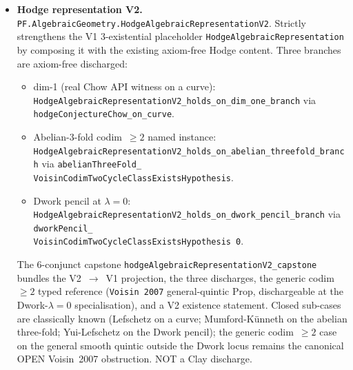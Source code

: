 \begin{itemize}
\item \textbf{Hodge representation V2.}
\texttt{PF.\allowbreak{}Algebraic\allowbreak{}Geometry.\allowbreak{}Hodge\allowbreak{}Algebraic\allowbreak{}Representation\allowbreak{}V2}.
Strictly strengthens the V1 3-existential placeholder
\texttt{HodgeAlgebraicRepresentation} by composing it with the
existing axiom-free Hodge content. Three branches are axiom-free
discharged:
\begin{itemize}
\item dim-1 (real Chow API witness on a curve):
\texttt{Hodge\allowbreak{}Algebraic\allowbreak{}Representation\allowbreak{}V2\_\allowbreak{}holds\_\allowbreak{}on\_\allowbreak{}dim\_\allowbreak{}one\_\allowbreak{}branch}
via \texttt{hodge\allowbreak{}Conjecture\allowbreak{}Chow\_\allowbreak{}on\_\allowbreak{}curve}.
\item Abelian-3-fold codim~$\ge 2$ named instance:
\texttt{Hodge\allowbreak{}Algebraic\allowbreak{}Representation\allowbreak{}V2\_\allowbreak{}holds\_\allowbreak{}on\_\allowbreak{}abelian\_\allowbreak{}threefold\_\allowbreak{}branch}
via
\texttt{abelianThreeFold\_\\VoisinCodimTwoCycleClassExistsHypothesis}.
\item Dwork pencil at $\lambda = 0$:
\texttt{Hodge\allowbreak{}Algebraic\allowbreak{}Representation\allowbreak{}V2\_\allowbreak{}holds\_\allowbreak{}on\_\allowbreak{}dwork\_\allowbreak{}pencil\_\allowbreak{}branch}
via \texttt{dworkPencil\_\\VoisinCodimTwoCycleClassExistsHypothesis~0}.
\end{itemize}
The 6-conjunct capstone
\texttt{hodge\allowbreak{}Algebraic\allowbreak{}Representation\allowbreak{}V2\_\allowbreak{}capstone} bundles the
V2~$\to$~V1 projection, the three discharges, the generic
codim~$\ge 2$ typed reference (\texttt{Voisin~2007} general-quintic
Prop, dischargeable at the Dwork-$\lambda = 0$ specialisation), and a
V2 existence statement. Closed sub-cases are classically known
(Lefschetz on a curve; Mumford-K\"unneth on the abelian three-fold;
Yui-Lefschetz on the Dwork pencil); the generic codim~$\ge 2$
case on the general smooth quintic outside the Dwork locus remains
the canonical OPEN Voisin~2007 obstruction. NOT a Clay discharge.


\end{itemize}
